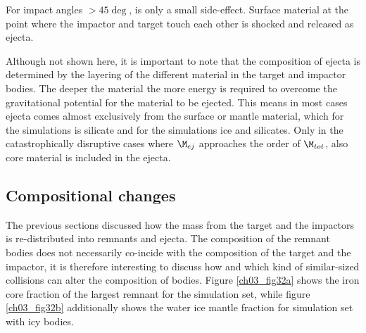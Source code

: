 
For impact angles $>  45\deg$, is only a small side-effect. Surface material at the point where the impactor and target touch each other is shocked and released as ejecta. 

Although not shown here, it is important to note that the composition of ejecta is determined by the layering of the different material in the target and impactor bodies. The deeper the material the more energy is required to overcome the gravitational potential for the material to be ejected. This means in most cases ejecta comes almost exclusively from the surface or mantle material, which for the \css simulations is silicate and for the \iss simulations ice and silicates. Only in the catastrophically disruptive cases where $\M_{ej}$ approaches the order of $\M_{tot}$, also core material is included in the ejecta.

\subsection{Compositional changes}
The previous sections discussed how the mass from the target and the impactors is re-distributed into remnants and ejecta. The composition of the remnant bodies does not necessarily co-incide with the composition of the target and the impactor, it is therefore interesting to discuss how and which kind of similar-sized collisions can alter the composition of bodies. Figure \ref{ch03_fig32a} shows the iron core fraction of the largest remnant for the \css simulation set, while figure \ref{ch03_fig32b} additionally shows the water ice mantle fraction for simulation set \iss with icy bodies.

